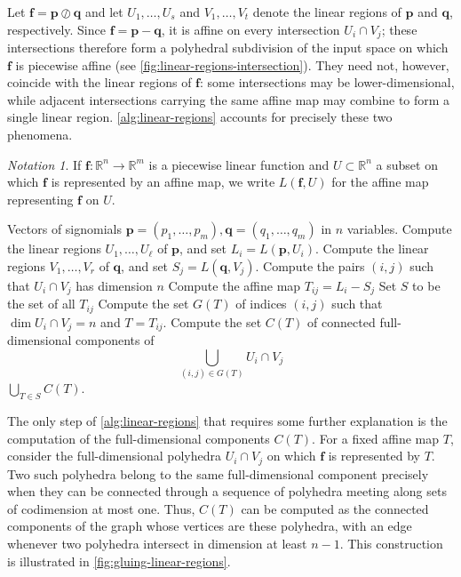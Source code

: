 \documentclass[10pt]{article}
\theoremstyle{definition}
\theoremstyle{remark}
\newtheorem*{notation}{Notation}
\newcommand{\RR}{{\mathbb{R}}}
\renewcommand{\vec}[1]{\mathbf{#1}}
\def\vf{{\vec{f}}}
\def\vp{{\vec{p}}}
\def\vq{{\vec{q}}}
\begin{document}
Let $\vf = \vp \oslash \vq$ and let $U_1, \ldots, U_s$ and $V_1, \ldots, V_t$ denote the linear regions of $\vp$ and $\vq$, respectively. Since $\vf = \vp - \vq$, it is affine on every intersection $U_i \cap V_j$; these intersections therefore form a polyhedral subdivision of the input space on which $\vf$ is piecewise affine (see \cref{fig:linear-regions-intersection}). They need not,
however, coincide with the linear regions of $\vf$: some intersections may be lower-dimensional, while adjacent intersections carrying the same affine map may combine to form a single linear region. \cref{alg:linear-regions} accounts for precisely these two phenomena.

\begin{notation}
    If $\vf : \RR^n \to \RR^m$ is a piecewise linear function and $U \subset \RR^n$ a subset on which $\vf$ is represented by an affine map, we write $L(\vf, U)$ for the affine map representing $\vf$ on $U$.
\end{notation}


\begin{algorithm}[H]
  \caption{Linear regions of rational signomials}
    \begin{algorithmic}[1]
        \Require Vectors of signomials $\vp = (p_1, \dotsc, p_m), \vq =  (q_1, \dotsc, q_m)$ in $n$ variables.
        \State Compute the linear regions $U_1, \dotsc, U_\ell$ of $\vp$, and set $L_i = L(\vp, U_i)$.
        \State Compute the linear regions $V_1, \dotsc, V_r$ of $\vq$, and set $S_j = L(\vq, V_j)$.
        \State Compute the pairs $(i, j)$ such that $U_i \cap V_j$ has dimension $n$
            \State Compute the affine map $T_{ij} = L_i - S_j$
        \EndFor
        \State Set $S$ to be the set of all $T_{ij}$
            \State Compute the set $G(T)$ of indices $(i, j)$ such that $\dim U_i \cap V_j = n$ and $T = T_{ij}$.
            \State Compute the set $C(T)$ of connected full-dimensional components of
            $$
                \bigcup_{(i, j) \in G(T)} U_i \cap V_j
            $$
        \EndFor
        \State \Return $\bigcup_{T \in S} C(T)$.
    \end{algorithmic}
    \label{alg:linear-regions}
\end{algorithm}

The only step of \cref{alg:linear-regions} that requires some further explanation is the computation of the full-dimensional components $C(T)$. For a fixed affine map $T$, consider the full-dimensional polyhedra $U_i \cap V_j$ on which $\vf$ is represented by $T$. Two such polyhedra belong to the same full-dimensional component precisely when they can be connected through a sequence of polyhedra meeting along sets of codimension at most one. Thus, $C(T)$ can be computed as the connected components of the graph whose vertices are these polyhedra, with an edge whenever two polyhedra intersect in dimension at least $n-1$. This construction is illustrated in \cref{fig:gluing-linear-regions}.
\end{document}
